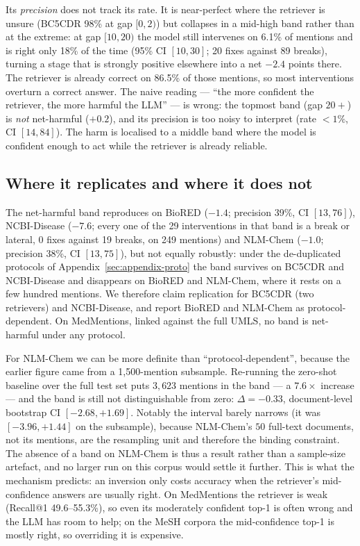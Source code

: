 \documentclass[11pt]{article}
\makeatletter
\newcommand{\rone}{Recall@1}
\makeatother
\begin{document}
Its \emph{precision} does not track its rate. It is near-perfect where the retriever
is unsure (BC5CDR 98\% at gap $[0,2)$) but collapses in a mid-high band rather than at
the extreme: at gap $[10,20)$ the model still intervenes on 6.1\% of mentions and is
right only 18\% of the time (95\% CI $[10,30]$; 20 fixes against 89 breaks), turning a
stage that is strongly positive elsewhere into a net $-2.4$ points there. The retriever
is already correct on 86.5\% of those mentions, so most interventions overturn a
correct answer. The naive reading --- ``the more confident the retriever, the more
harmful the LLM'' --- is wrong: the topmost band (gap $20+$) is \emph{not} net-harmful
($+0.2$), and its precision is too noisy to interpret (rate $<1\%$, CI $[14,84]$). The
harm is localised to a middle band where the model is confident enough to act while the
retriever is already reliable.

\subsection{Where it replicates and where it does not}

The net-harmful band reproduces on BioRED ($-1.4$; precision 39\%, CI $[13,76]$),
NCBI-Disease ($-7.6$; every one of the 29 interventions in that band is a break or
lateral, 0 fixes against 19 breaks, on 249 mentions) and NLM-Chem ($-1.0$; precision 38\%,
CI $[13,75]$), but not equally robustly: under the de-duplicated protocols of
Appendix~\ref{sec:appendix-proto} the band survives on BC5CDR and NCBI-Disease and disappears on BioRED
and NLM-Chem, where it rests on a few hundred mentions. We therefore claim replication
for BC5CDR (two retrievers) and NCBI-Disease, and report BioRED and NLM-Chem as
protocol-dependent. On MedMentions, linked against the full UMLS, no band is
net-harmful under any protocol.

For NLM-Chem we can be more definite than ``protocol-dependent'', because the earlier
figure came from a 1{,}500-mention subsample. Re-running the zero-shot baseline over the
full test set puts $3{,}623$ mentions in the band --- a $7.6\times$ increase --- and the
band is still not distinguishable from zero: $\Delta = -0.33$, document-level bootstrap
CI $[-2.68, +1.69]$. Notably the interval barely narrows (it was $[-3.96,+1.44]$ on the
subsample), because NLM-Chem's $50$ full-text documents, not its mentions, are the
resampling unit and therefore the binding constraint. The absence of a band on NLM-Chem
is thus a result rather than a sample-size artefact, and no larger run on this corpus
would settle it further.
This is what the mechanism predicts: an inversion only costs accuracy when the
retriever's mid-confidence answers are usually right. On MedMentions the retriever is
weak (\rone{} 49.6--55.3\%), so even its moderately confident top-1 is often wrong and
the LLM has room to help; on the MeSH corpora the mid-confidence top-1 is mostly
right, so overriding it is expensive.
\end{document}
